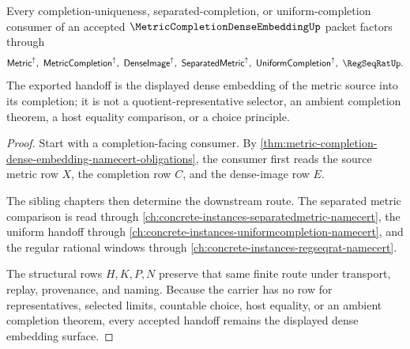 \begin{theorem}
\label{thm:metric-completion-dense-embedding-handoff}
Every completion-uniqueness, separated-completion, or uniform-completion consumer of an accepted $\MetricCompletionDenseEmbeddingUp$ packet factors through
$$
\mathsf{Metric}^{\uparrow},\ \mathsf{MetricCompletion}^{\uparrow},\ \mathsf{DenseImage}^{\uparrow},\ \mathsf{SeparatedMetric}^{\uparrow},\ \mathsf{UniformCompletion}^{\uparrow},\ \RegSeqRatUp .
$$
The exported handoff is the displayed dense embedding of the metric source into its completion; it is not a quotient-representative selector, an ambient completion theorem, a host equality comparison, or a choice principle.
\end{theorem}
\begin{proof}
Start with a completion-facing consumer. By \autoref{thm:metric-completion-dense-embedding-namecert-obligations}, the consumer first reads the source metric row $X$, the completion row $C$, and the dense-image row $E$.

The sibling chapters then determine the downstream route. The separated metric comparison is read through \autoref{ch:concrete-instances-separatedmetric-namecert}, the uniform handoff through \autoref{ch:concrete-instances-uniformcompletion-namecert}, and the regular rational windows through \autoref{ch:concrete-instances-regseqrat-namecert}.

The structural rows $H,K,P,N$ preserve that same finite route under transport, replay, provenance, and naming. Because the carrier has no row for representatives, selected limits, countable choice, host equality, or an ambient completion theorem, every accepted handoff remains the displayed dense embedding surface.
\end{proof}

